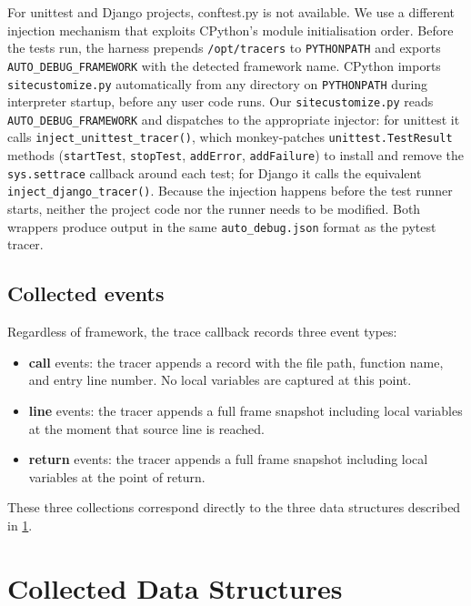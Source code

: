 For unittest and Django projects, conftest.py is not available. We use a different injection mechanism that exploits CPython's module initialisation order. Before the tests run, the harness prepends \texttt{/opt/tracers} to \texttt{PYTHONPATH} and exports \texttt{AUTO\_DEBUG\_FRAMEWORK} with the detected framework name. CPython imports \texttt{sitecustomize.py} automatically from any directory on \texttt{PYTHONPATH} during interpreter startup, before any user code runs. Our \texttt{sitecustomize.py} reads \texttt{AUTO\_DEBUG\_FRAMEWORK} and dispatches to the appropriate injector: for unittest it calls \texttt{inject\_unittest\_tracer()}, which monkey-patches \texttt{unittest.TestResult} methods (\texttt{startTest}, \texttt{stopTest}, \texttt{addError}, \texttt{addFailure}) to install and remove the \texttt{sys.settrace} callback around each test; for Django it calls the equivalent \texttt{inject\_django\_tracer()}. Because the injection happens before the test runner starts, neither the project code nor the runner needs to be modified. Both wrappers produce output in the same \texttt{auto\_debug.json} format as the pytest tracer.

\subsection{Collected events}

Regardless of framework, the trace callback records three event types:

\begin{itemize}
    \item \textbf{call} events: the tracer appends a record with the file path, function name, and entry line number. No local variables are captured at this point.
    \item \textbf{line} events: the tracer appends a full frame snapshot including local variables at the moment that source line is reached.
    \item \textbf{return} events: the tracer appends a full frame snapshot including local variables at the point of return.
\end{itemize}

These three collections correspond directly to the three data structures described in \cref{sec:data-structures}.


\section{Collected Data Structures}
\label{sec:data-structures}

